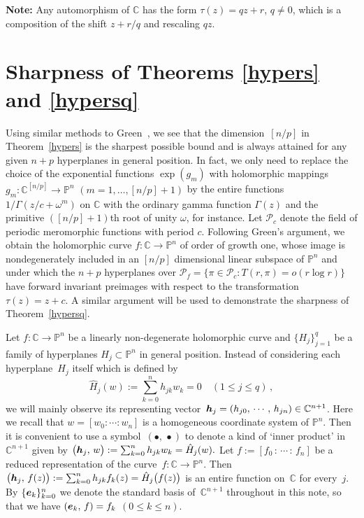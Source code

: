 \documentclass{amsart}
\newcommand{\C}{\mathbb{C}}
\theoremstyle{definition}
\numberwithin{equation}{section}
\numberwithin{theorem}{section}
\begin{document}
\medskip

\noindent \textbf{Note:} Any automorphism of $\C$ has the form
$\tau(z)=qz+r$, $q\not=0$, which is a composition of the shift
$z+r/q$ and rescaling $qz$.


\section{Sharpness of Theorems \ref{hypers} and
\ref{hypersq}}\label{examplesec}

Using similar methods to Green~\cite{green:72}, we see that the
dimension~$[n/p]$ in Theorem~\ref{hypers} is the sharpest possible bound and is always attained for any given $n+p$ hyperplanes in general position. In
fact, we only need to replace the choice of the exponential
functions $\exp (g_m)$ with holomorphic mappings
$g_m:\mathbb{C}^{[n/p]}\to\mathbb{P}^n$ $(m=1, \ldots, [n/p]+1)$
by the entire functions $1/\Gamma(z/c+\omega^m)$ on $\mathbb{C}$
with the ordinary gamma function $\Gamma(z)$ and the primitive
$([n/p]+1)$th root of unity $\omega$, for instance. Let $\mathcal{P}_c$ denote the field of periodic meromorphic functions with period $c$. Following
Green's argument, we obtain the holomorphic curve
$f:\mathbb{C}\to\mathbb{P}^n$ of order of growth one, whose image
is nondegenerately included in an $[n/p]$ dimensional linear
subspace of $\mathbb{P}^n$ and under which the $n+p$ hyperplanes
over $\mathcal{P}_{f}=\{\pi\in\mathcal{P}_c:T(r,\pi)=o(r\log r)\}$
have forward invariant preimages with respect to the
transformation $\tau(z)=z+c$. A similar argument will be used to demonstrate the sharpness of Theorem~\ref{hypersq}.

Let $f:\mathbb{C}\to\mathbb{P}^n$ be a linearly
non-degenerate holomorphic curve and $\{H_j\}_{j=1}^q$ be a family
of hyperplanes $H_j\subset \mathbb{P}^n$ in general
position. Instead of considering each hyperplane~$H_j$ itself
which is defined by
$$
\hat{H}_j(w):=\sum_{k=0}^n h_{jk}w_k =0 \quad (1\leq j\leq q)\,,
$$
we will mainly observe its representing
vector~$\mbox{\boldmath$h$}_j=(h_{j0},\, \cdots \, ,\, h_{jn}) \in
\mathbb{C}^{n+1}$. Here we recall that $w=[w_0:\cdots :w_n]$ is a
homogeneous coordinate system of $\mathbb{P}^n$. Then
it is convenient to use a symbol~$(\bullet,\, \bullet)$ to denote
a kind of `inner product' in $\mathbb{C}^{n+1}$ given by
$\bigl(\mbox{\boldmath$h$}_j,\,w\bigr):=\sum_{k=0}^n h_{jk}
w_k=\hat{H}_j(w).$ Let $f:=[f_0\, : \, \cdots \,:\, f_n]$ be a
reduced representation of the
curve~$f:\mathbb{C}\to\mathbb{P}^n$. Then
$\bigl(\mbox{\boldmath$h$}_j,\,f(z)\bigr):=\sum_{k=0}^n h_{jk}
f_k(z)=\hat{H}_j\bigl(f(z)\bigr)$ is an entire function
on~$\mathbb{C}$ for every~$j$. By
$\{\mbox{\boldmath$e$}_{k}\}_{k=0}^{n}$ we denote the standard
basis of~$\mathbb{C}^{n+1}$ throughout in this note, so that we
have $(\mbox{\boldmath$e$}_{k},\,f)=f_{k}$ $(0\leq k\leq n)$.
\end{document}
